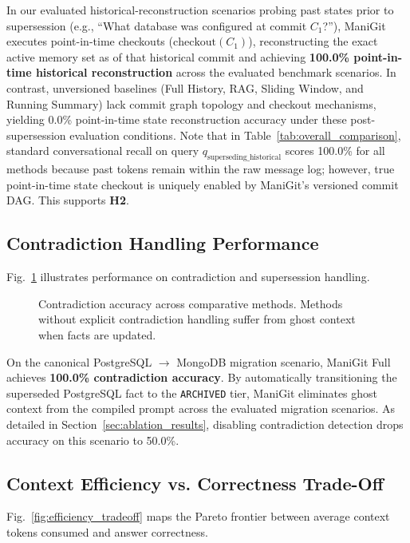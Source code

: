 In our evaluated historical-reconstruction scenarios probing past states prior to supersession (e.g., ``What database was configured at commit $C_1$?''), ManiGit executes point-in-time checkouts ($\text{checkout}(C_1)$), reconstructing the exact active memory set as of that historical commit and achieving \textbf{100.0\% point-in-time historical reconstruction} across the evaluated benchmark scenarios. In contrast, unversioned baselines (Full History, RAG, Sliding Window, and Running Summary) lack commit graph topology and checkout mechanisms, yielding 0.0\% point-in-time state reconstruction accuracy under these post-supersession evaluation conditions. Note that in Table~\ref{tab:overall_comparison}, standard conversational recall on query $q_\text{superseding\_historical}$ scores 100.0\% for all methods because past tokens remain within the raw message log; however, true point-in-time state checkout is uniquely enabled by ManiGit's versioned commit DAG. This supports \textbf{H2}.

\subsection{Contradiction Handling Performance}
\label{sec:contradiction_results}
Fig.~\ref{fig:contradiction_handling} illustrates performance on contradiction and supersession handling.

\begin{figure}[t]
\centering

\caption{Contradiction accuracy across comparative methods. Methods without explicit contradiction handling suffer from ghost context when facts are updated.}
\label{fig:contradiction_handling}
\end{figure}

On the canonical PostgreSQL $\to$ MongoDB migration scenario, ManiGit Full achieves \textbf{100.0\% contradiction accuracy}. By automatically transitioning the superseded PostgreSQL fact to the \texttt{ARCHIVED} tier, ManiGit eliminates ghost context from the compiled prompt across the evaluated migration scenarios. As detailed in Section~\ref{sec:ablation_results}, disabling contradiction detection drops accuracy on this scenario to 50.0\%.

\subsection{Context Efficiency vs. Correctness Trade-Off}
Fig.~\ref{fig:efficiency_tradeoff} maps the Pareto frontier between average context tokens consumed and answer correctness.


